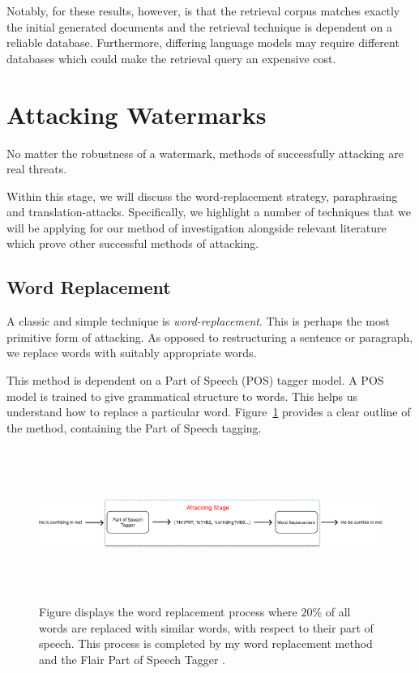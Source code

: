 \documentclass{l4proj}
\theoremstyle{definition}
\begin{document}
        Notably, for these results, however, is that the retrieval corpus matches exactly the initial generated documents and the retrieval technique is dependent on a reliable database. Furthermore, differing language models may require different databases which could make the retrieval query an expensive cost. 

\section{Attacking Watermarks}
        No matter the robustness of a watermark, methods of successfully attacking are real threats. 

        Within this stage, we will discuss the word-replacement strategy, paraphrasing and translation-attacks. Specifically, we highlight a number of techniques that we will be applying for our method of investigation alongside relevant literature which prove other successful methods of attacking.

    \subsection{Word Replacement}
        A classic and simple technique is \emph{word-replacement}. This is perhaps the most primitive form of attacking. As opposed to restructuring a sentence or paragraph, we replace words with suitably appropriate words.

        This method is dependent on a Part of Speech (POS) tagger model. A POS model is trained to give grammatical structure to words. This helps us understand how to replace a particular word. Figure~\ref{fig:word-replacement-process} provides a clear outline of the method, containing the Part of Speech tagging. 

        \begin{figure}[h]
            \centering
            \includegraphics[height=5cm, width=1\linewidth, keepaspectratio]{images/background/word-replacement-process.pdf}
            \caption{Figure displays the word replacement process where 20\% of all words are replaced with similar words, with respect to their part of speech. This process is completed by my word replacement method and the Flair Part of Speech Tagger \citep{akbik2018coling}.}
            \label{fig:word-replacement-process}
        \end{figure}
        
\end{document}
